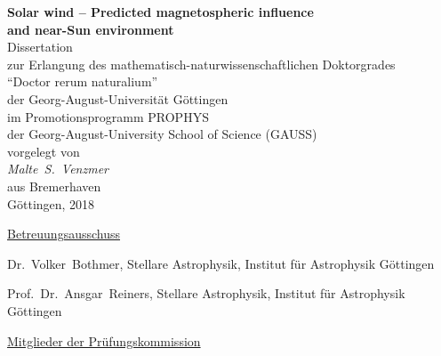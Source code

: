 
\begin{titlepage}
	\begin{center}
		\vspace*{\fill}
		\renewcommand{\baselinestretch}{1.5}
		{\LARGE\sffamily
			\textbf{Solar wind -- Predicted magnetospheric influence\\and near-Sun environment}\\
		}
		\Large\rmfamily
		\vspace{3\baselineskip}
		Dissertation\\
		zur Erlangung des mathematisch-naturwissenschaftlichen Doktorgrades\\
		``Doctor rerum naturalium''\\
		der Georg-August-Universität Göttingen\\
		\vspace{\baselineskip}
		im Promotionsprogramm PROPHYS\\
		der Georg-August-University School of Science (GAUSS)\\
		\vspace{4\baselineskip}
		vorgelegt von\\
		\textit{%
			Malte~S.~Venzmer\\
		}
		aus Bremerhaven\\
		\vspace{4\baselineskip}
		Göttingen, 2018
		\vspace{\baselineskip}
		\vspace{\fill}
	\end{center}
\end{titlepage}

\newpage


\vspace*{\fill}

\noindent \underline{Betreuungsausschuss}
\vspace{\baselineskip}

Dr.~Volker~Bothmer, Stellare Astrophysik, Institut für Astrophysik Göttingen
\vspace{\baselineskip}

Prof.~Dr.~Ansgar~Reiners, Stellare Astrophysik, Institut für Astrophysik Göttingen
% 
\vspace{3\baselineskip}

\noindent \underline{Mitglieder der Prüfungskommission}
\vspace{\baselineskip}

